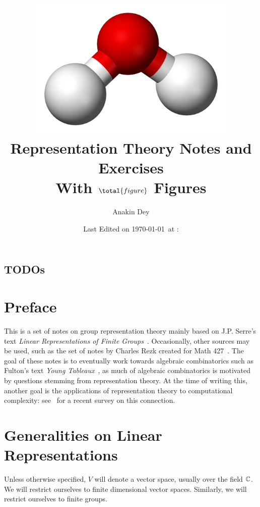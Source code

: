 \documentclass[letterpaper, 11pt, oneside]{book}
\title{\vspace{-100pt} \includegraphics[width=0.75\textwidth]{figs/water.png} \\ {\Huge Representation Theory Notes and Exercises} \\ {\small With $\total{figure}$ Figures}}
\author{\Large Anakin Dey}
\date{\small Last Edited on \today\ at \DTMfetchhour{now}:\DTMfetchminute{now}}
\newcommand{\CoverName}{Cover}
\begin{document}
\frontmatter
\renewcommand{\thepage}{\CoverName}
\maketitle


\section*{TODOs}





\tableofcontents
\clearpage


\listoftheorems[ignoreall, show={defn}, title={List of Definitions}]

\listoftheorems[ignoreall, show={ex}, title={List of Examples and Counterexamples}]

\chapter*{Preface}

This is a set of notes on group representation theory mainly based on J.P. Serre's text \emph{Linear Representations of Finite Groups}~\cite{book:SerreLinReps}.
Occasionally, other sources may be used, such as the set of notes by Charles Rezk created for Math 427~\cite{note:rezk_reps}.
The goal of these notes is to eventually work towards algebraic combinatorics such as Fulton's text \emph{Young Tableaux}~\cite{book:FultonTableaux}, as much of algebraic combinatorics is motivated by questions stemming from representation theory.
At the time of writing this, another goal is the applications of representation theory to computational complexity: see~\cite{misc:PanovaComputational} for a recent survey on this connection.

\mainmatter

\chapter{Generalities on Linear Representations}

Unless otherwise specified, $V$ will denote a vector space, usually over the field $\mathbb{C}$.
We will restrict ourselves to finite dimensional vector spaces.
Similarly, we will restrict ourselves to finite groups.
\end{document}
